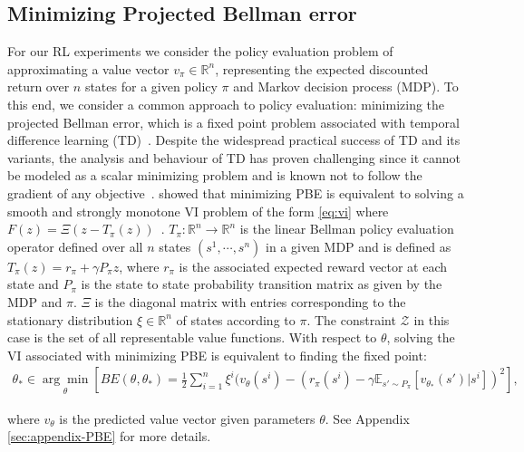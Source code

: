 \documentclass{article} %
\theoremstyle{definition}
\newcommand{\reals}{\mathbb{R}}
\newcommand{\expect}[2][]{\mathbb{E}_{#1}\left[ #2\right]}
\begin{document}
\subsection{Minimizing Projected Bellman error}
\label{sec:experiments_PBE}

For our RL experiments we consider the policy evaluation problem of approximating a value vector $v_{\pi} \in \reals^n$, representing the expected discounted return over $n$ states for a given policy $\pi$ and Markov decision process (MDP).
To this end, we consider a common approach to policy evaluation: minimizing the projected Bellman error, which is a fixed point problem associated with temporal difference learning (TD)~\citep{sutton1988learning}. %
Despite the widespread practical success of TD and its variants, the analysis and behaviour of TD has proven challenging since it cannot be modeled as a scalar minimizing problem and is known not to follow the gradient of any objective~\citep{baird1995residual, antos2008learning}.
\citet{bertsekas2009projected} showed that minimizing PBE is equivalent to solving a smooth and strongly monotone VI problem of the form \eqref{eq:vi} where $F(z) = \Xi(z-T_{\pi}(z))$~\citep{bertsekas2009projected}. $T_{\pi} : \reals^n \to \reals^n$ is the linear Bellman policy evaluation operator defined over all $n$ states $(s^1, \cdots, s^n)$ in a given MDP and is defined as $T_{\pi}(z) = r_{\pi} + \gamma P_{\pi}z$,
where $r_{\pi}$ is the associated expected reward vector at each state and $P_{\pi}$ is the state to state probability transition matrix as given by the MDP and $\pi$.
$\Xi$ is the diagonal matrix with entries corresponding to the stationary distribution $\xi \in \reals^n$ of states according to $\pi$.
The constraint $\mathcal{Z}$ in this case is the set of all representable value functions. 
With respect to $\theta$, solving the VI associated with minimizing PBE is equivalent to finding the fixed point:
\begin{align}\label{eq:PBE}
    \theta_\ast \in \underset{\theta}{\arg\min} \left[ BE(\theta, \theta_\ast) =  \frac{1}{2}\sum_{i=1}^n \xi^i(v_{\theta}(s^i) - (r_\pi(s^i)- \gamma\expect[s'\sim P_\pi]{v_{\theta_\ast}(s')|s^i})^2\right],
\end{align}

where $v_{\theta}$ is the predicted value vector given parameters $\theta$. 
See Appendix \ref{sec:appendix-PBE} for more details.
\end{document}
